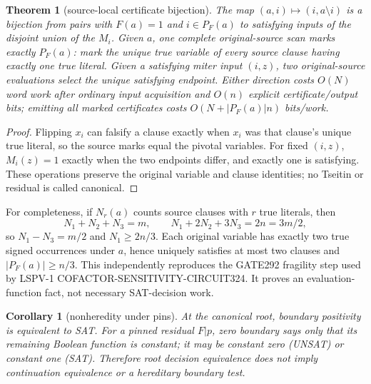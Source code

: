 \documentclass[11pt]{article}
\newtheorem{theorem}{Theorem}
\newtheorem{corollary}{Corollary}
\begin{document}
\begin{theorem}[source-local certificate bijection]
The map $(a,i)\mapsto(i,a\setminus i)$ is a bijection from pairs with $F(a)=1$ and $i\in P_F(a)$ to satisfying inputs of the disjoint union of the $M_i$. Given $a$, one complete original-source scan marks exactly $P_F(a)$: mark the unique true variable of every source clause having exactly one true literal. Given a satisfying miter input $(i,z)$, two original-source evaluations select the unique satisfying endpoint. Either direction costs $O(N)$ word work after ordinary input acquisition and $O(n)$ explicit certificate/output bits; emitting all marked certificates costs $O(N+|P_F(a)|n)$ bits/work.
\end{theorem}
\begin{proof}
Flipping $x_i$ can falsify a clause exactly when $x_i$ was that clause's unique true literal, so the source marks equal the pivotal variables. For fixed $(i,z)$, $M_i(z)=1$ exactly when the two endpoints differ, and exactly one is satisfying. These operations preserve the original variable and clause identities; no Tseitin or residual is called canonical.
\end{proof}

For completeness, if $N_r(a)$ counts source clauses with $r$ true literals, then
\[
 N_1+N_2+N_3=m,\qquad N_1+2N_2+3N_3=2n=3m/2,
\]
so $N_1-N_3=m/2$ and $N_1\ge 2n/3$. Each original variable has exactly two true signed occurrences under $a$, hence uniquely satisfies at most two clauses and $|P_F(a)|\ge n/3$. This independently reproduces the GATE292 fragility step used by LSPV-1 COFACTOR-SENSITIVITY-CIRCUIT324. It proves an evaluation-function fact, not necessary SAT-decision work.

\begin{corollary}[nonheredity under pins]
At the canonical root, boundary positivity is equivalent to SAT. For a pinned residual $F|p$, zero boundary says only that its remaining Boolean function is constant; it may be constant zero (UNSAT) or constant one (SAT). Therefore root decision equivalence does not imply continuation equivalence or a hereditary boundary test.
\end{corollary}
\end{document}
